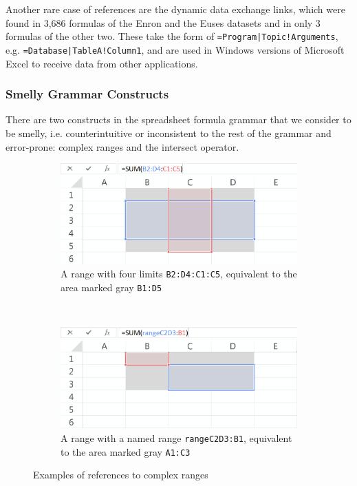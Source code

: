 \documentclass[times]{smrauth}
\begin{document}
Another rare case of references are the dynamic data exchange links, which were found in 3,686 formulas of the Enron and the Euses datasets and in only 3 formulas of the other two. These take the form of \texttt{=Program|Topic!Arguments}, e.g. \texttt{=Database|TableA!Column1}, and are used in Windows versions of Microsoft Excel to receive  data from other applications.

\subsubsection{Smelly Grammar Constructs}
There are two constructs in the spreadsheet formula grammar that we consider to be smelly, i.e. counterintuitive or inconsistent to the rest of the grammar and error-prone: complex ranges and the intersect operator.
\begin{figure}
	\centering
	\begin{subfigure}[b]{0.49\textwidth}
		\centering
		\includegraphics[width=1\textwidth]{img/complexRanges}
		\caption{A range with four limits \texttt{B2:D4:C1:C5}, equivalent to the area marked gray \texttt{B1:D5}}
		\label{fig:complexA}
	\end{subfigure}
	~ %
	\begin{subfigure}[b]{0.49\textwidth}
		\centering
		\includegraphics[width=1\textwidth]{img/complexNamedRanges}
		\caption{A range with a named range \texttt{rangeC2D3:B1}, equivalent to the area marked gray \texttt{A1:C3}}
		\label{fig:complexB}
	\end{subfigure}
	\caption{Examples of references to complex ranges}\label{Figure:ComplexRanges}
\end{figure}
\end{document}
